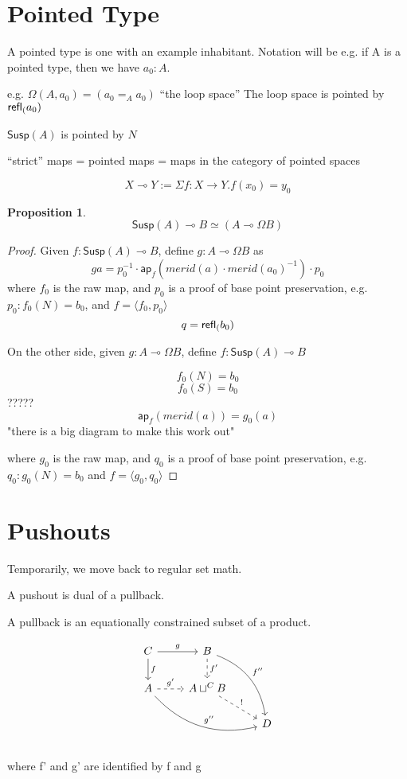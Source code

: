 \documentclass[11pt]{article}
\newcommand{\lolli}{\multimap}
\newcommand*{\ap}{\mathsf{ap}}
\newcommand{\susp}[1]{\mathsf{Susp}(#1)}
\newtheorem{proposition}{Proposition}
\begin{document}
\section{Pointed Type}
A pointed type is one with an example inhabitant. Notation will be e.g. if A is a pointed type, then we have $a_0 : A$.

e.g. $\Omega(A, a_0) = (a_0 =_A a_0)$ ``the loop space''
The loop space is pointed by $\mathsf{refl}_{(} a_0)$

$\susp{A}$ is pointed by $N$

``strict'' maps = pointed maps = maps in the category of pointed spaces

$$X \lolli Y := \Sigma f : X \to Y . f(x_0) = y_0$$
\begin{proposition}
$$\susp{A} \lolli B \simeq (A \lolli \Omega B)$$
\end{proposition}
\begin{proof}
Given $f : \susp{A} \lolli B$, define $g : A \lolli \Omega B$ as
$$g a = p_0^{-1} \cdot \ap_f(merid(a) \cdot merid(a_0)^{-1}) \cdot p_0$$
where $f_0$ is the raw map, and $p_0$ is a proof of base point preservation, e.g. $p_0 : f_0(N) = b_0$, and $f = \langle f_0, p_0\rangle$
$$q = \mathsf{refl}_{(} b_0)$$

On the other side, given $g : A \lolli \Omega B$, define $f : \susp{A} \lolli B$

$$f_0(N) = b_0$$
$$f_0(S) = b_0$$
?????
$$\ap_f(merid(a)) = g_0(a)$$
"there is a big diagram to make this work out"

where $g_0$ is the raw map, and $q_0$ is a proof of base point preservation, e.g. $q_0 : g_0(N) = b_0$ and $f = \langle g_0, q_0\rangle$
\end{proof}

\section{Pushouts}
Temporarily, we move back to regular set math.

A pushout is dual of a pullback.

A pullback is an equationally constrained subset of a product.

\begin{equation*}
\begin{tikzcd}
C \arrow{r}{g} \arrow{d}{f} & B \arrow[dashed]{d}{f'} \arrow[bend left]{ddr}{f''}\\
A \arrow[dashed]{r}{g'} \arrow[bend right]{drr}{g''} & A \sqcup^C B \arrow[dashed]{dr}{!}\\
{} & {} & D\\
\end{tikzcd}
\end{equation*}
where f' and g' are identified by f and g
\end{document}
